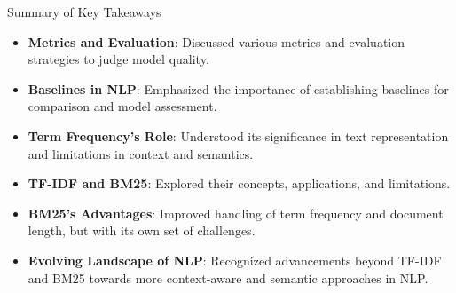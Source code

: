 \documentclass{beamer}
\begin{document}
\begin{frame}{Summary of Key Takeaways}

\begin{itemize}
  \item \textbf{Metrics and Evaluation}: Discussed various metrics and evaluation strategies to judge model quality.
  \item \textbf{Baselines in NLP}: Emphasized the importance of establishing baselines for comparison and model assessment.
  \item \textbf{Term Frequency's Role}: Understood its significance in text representation and limitations in context and semantics.
  \item \textbf{TF-IDF and BM25}: Explored their concepts, applications, and limitations.
  \item \textbf{BM25's Advantages}: Improved handling of term frequency and document length, but with its own set of challenges.
  \item \textbf{Evolving Landscape of NLP}: Recognized advancements beyond TF-IDF and BM25 towards more context-aware and semantic approaches in NLP.
\end{itemize}

\end{frame}
\end{document}
